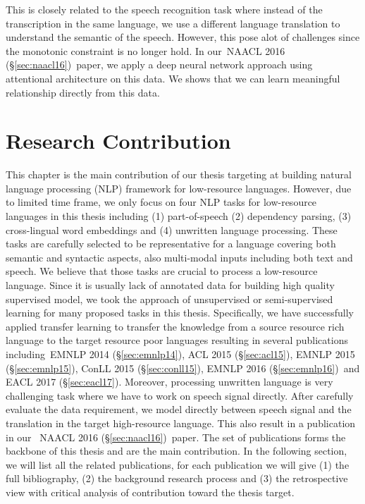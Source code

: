 \documentclass[12pt,twoside,final,hidelinks]{ltthesis}
\theoremstyle{definition}
\newcommand\emnlpiv{EMNLP 2014 (\S\ref{sec:emnlp14})}
\newcommand\conllv{ConLL 2015 (\S\ref{sec:conll15})}
\newcommand\aclv{ACL 2015 (\S\ref{sec:acl15})}
\newcommand\emnlpv{EMNLP 2015 (\S\ref{sec:emnlp15})}
\newcommand\naaclvi{NAACL 2016 (\S\ref{sec:naacl16})}
\newcommand\emnlpvi{EMNLP 2016 (\S\ref{sec:emnlp16})}
\newcommand\eaclvii{EACL 2017 (\S\ref{sec:eacl17})}
\begin{document}
This is closely related to the speech recognition task where instead of the transcription in the same language, we use a different language translation to understand the semantic of the speech. However, this pose alot of challenges since the monotonic constraint is no longer hold. In our~\naaclvi\ paper, we apply a deep neural network approach using attentional architecture on this data. We shows that we can learn meaningful relationship directly from this data.   


\chapter{Research Contribution}
\label{chap:research_summary}
This chapter is the main contribution of our thesis targeting at building natural language processing (NLP) framework for low-resource languages. 
However, due to limited time frame, we only focus on four NLP tasks 
for low-resource languages in this thesis including (1) part-of-speech  (2) dependency parsing, (3) cross-lingual word embeddings and (4) unwritten 
language processing. These tasks are carefully selected to be representative for a language covering both semantic and syntactic aspects, also 
multi-modal inputs including both text and speech. We believe that those tasks are crucial to process a low-resource language.  
Since it is usually lack of annotated data for building high quality supervised model, we took the approach of 
unsupervised or semi-supervised learning for many proposed tasks in this thesis. Specifically, we have successfully applied transfer learning 
to transfer the knowledge from a source resource rich language to the target resource poor languages resulting in several publications including~\emnlpiv, \aclv, 
\emnlpv, \conllv, \emnlpvi\ and \eaclvii . Moreover, processing unwritten language is very challenging task where we have to work on speech signal directly. After
carefully evaluate the data requirement, we model directly between speech signal and the translation in the target high-resource language. This also 
result in a publication in our ~\naaclvi\ paper.
The set of publications forms the backbone of this thesis and are the main contribution. 
In the following section, we will list all the related publications, for each publication we will give (1) the full bibliography, (2) the background research process and (3) the retrospective view with critical analysis of contribution toward the thesis target. 
\end{document}

